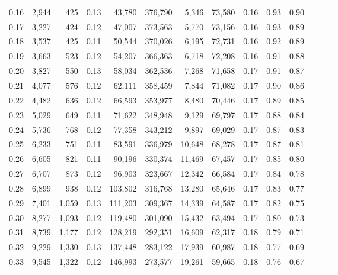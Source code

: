 \begin{tabular}{rrrrrrrrrrrrrr}
0.16 &   2,944 &    425 &  0.13 &   43,780 &  376,790 &   5,346 &  73,580 &  0.16 &  0.93 &      0.90 \\
0.17 &   3,227 &    424 &  0.12 &   47,007 &  373,563 &   5,770 &  73,156 &  0.16 &  0.93 &      0.89 \\
0.18 &   3,537 &    425 &  0.11 &   50,544 &  370,026 &   6,195 &  72,731 &  0.16 &  0.92 &      0.89 \\
0.19 &   3,663 &    523 &  0.12 &   54,207 &  366,363 &   6,718 &  72,208 &  0.16 &  0.91 &      0.88 \\
0.20 &   3,827 &    550 &  0.13 &   58,034 &  362,536 &   7,268 &  71,658 &  0.17 &  0.91 &      0.87 \\
0.21 &   4,077 &    576 &  0.12 &   62,111 &  358,459 &   7,844 &  71,082 &  0.17 &  0.90 &      0.86 \\
0.22 &   4,482 &    636 &  0.12 &   66,593 &  353,977 &   8,480 &  70,446 &  0.17 &  0.89 &      0.85 \\
0.23 &   5,029 &    649 &  0.11 &   71,622 &  348,948 &   9,129 &  69,797 &  0.17 &  0.88 &      0.84 \\
0.24 &   5,736 &    768 &  0.12 &   77,358 &  343,212 &   9,897 &  69,029 &  0.17 &  0.87 &      0.83 \\
0.25 &   6,233 &    751 &  0.11 &   83,591 &  336,979 &  10,648 &  68,278 &  0.17 &  0.87 &      0.81 \\
0.26 &   6,605 &    821 &  0.11 &   90,196 &  330,374 &  11,469 &  67,457 &  0.17 &  0.85 &      0.80 \\
0.27 &   6,707 &    873 &  0.12 &   96,903 &  323,667 &  12,342 &  66,584 &  0.17 &  0.84 &      0.78 \\
0.28 &   6,899 &    938 &  0.12 &  103,802 &  316,768 &  13,280 &  65,646 &  0.17 &  0.83 &      0.77 \\
0.29 &   7,401 &  1,059 &  0.13 &  111,203 &  309,367 &  14,339 &  64,587 &  0.17 &  0.82 &      0.75 \\
0.30 &   8,277 &  1,093 &  0.12 &  119,480 &  301,090 &  15,432 &  63,494 &  0.17 &  0.80 &      0.73 \\
0.31 &   8,739 &  1,177 &  0.12 &  128,219 &  292,351 &  16,609 &  62,317 &  0.18 &  0.79 &      0.71 \\
0.32 &   9,229 &  1,330 &  0.13 &  137,448 &  283,122 &  17,939 &  60,987 &  0.18 &  0.77 &      0.69 \\
0.33 &   9,545 &  1,322 &  0.12 &  146,993 &  273,577 &  19,261 &  59,665 &  0.18 &  0.76 &      0.67 \\

\end{tabular}
